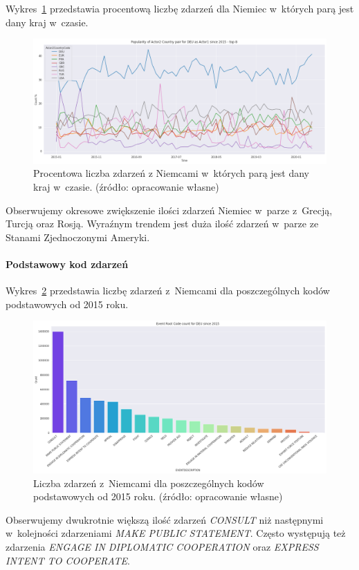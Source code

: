 \documentclass[11pt]{report}
\begin{document}
    Wykres~\ref{fig:DEUpairPerc} przedstawia procentową liczbę zdarzeń dla Niemiec w~których parą jest dany kraj w~czasie.
    \begin{figure}[!htp]
        \centering
        \includegraphics[width=\linewidth]{fig/DEU/DEUactor2PairPercinTIME.png}
        \caption{Procentowa liczba zdarzeń z Niemcami w~których parą jest dany kraj w~czasie. (źródło: opracowanie własne)}
        \label{fig:DEUpairPerc}
    \end{figure}
    Obserwujemy okresowe zwiększenie ilości zdarzeń Niemiec w~parze z~Grecją, Turcją oraz Rosją.
    Wyraźnym trendem jest duża ilość zdarzeń w~parze ze Stanami Zjednoczonymi Ameryki.

    \paragraph{Podstawowy kod zdarzeń}

    Wykres~\ref{fig:DEUPERC} przedstawia liczbę zdarzeń z~Niemcami dla poszczególnych kodów podstawowych od 2015 roku.
    \begin{figure}[!htp]
        \centering
        \includegraphics[width=\linewidth]{fig/DEU/DEUERC.png}
        \caption{Liczba zdarzeń z~Niemcami dla poszczególnych kodów podstawowych od 2015 roku. (źródło: opracowanie własne)}
        \label{fig:DEUPERC}
    \end{figure}
    Obserwujemy dwukrotnie większą ilość zdarzeń \textit{CONSULT} niż następnymi w~kolejności zdarzeniami \textit{MAKE PUBLIC STATEMENT}.
    Często występują też zdarzenia \textit{ENGAGE IN DIPLOMATIC COOPERATION} oraz \textit{EXPRESS INTENT TO COOPERATE}.
\end{document}
